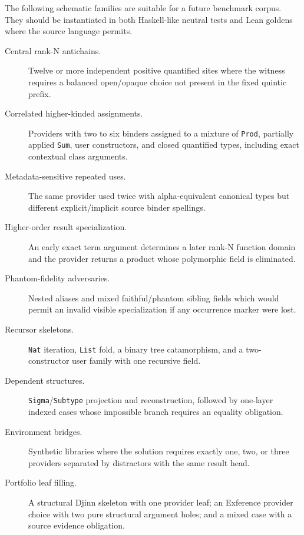 \documentclass[11pt]{article}
\newcommand{\code}[1]{\texttt{#1}}
\newcommand{\Djinn}{Djinn}
\newcommand{\Exference}{Exference}
\begin{document}
The following schematic families are suitable for a future benchmark corpus.
They should be instantiated in both Haskell-like neutral tests and Lean goldens
where the source language permits.

\begin{description}
  \item[Central rank-N antichains.]
    Twelve or more independent positive quantified sites where the witness
    requires a balanced open/opaque choice not present in the fixed quintic
    prefix.

  \item[Correlated higher-kinded assignments.]
    Providers with two to six binders assigned to a mixture of \code{Prod},
    partially applied \code{Sum}, user constructors, and closed quantified
    types, including exact contextual class arguments.

  \item[Metadata-sensitive repeated uses.]
    The same provider used twice with alpha-equivalent canonical types but
    different explicit/implicit source binder spellings.

  \item[Higher-order result specialization.]
    An early exact term argument determines a later rank-N function domain and
    the provider returns a product whose polymorphic field is eliminated.

  \item[Phantom-fidelity adversaries.]
    Nested aliases and mixed faithful/phantom sibling fields which would permit
    an invalid visible specialization if any occurrence marker were lost.

  \item[Recursor skeletons.]
    \code{Nat} iteration, \code{List} fold, a binary tree catamorphism, and a
    two-constructor user family with one recursive field.

  \item[Dependent structures.]
    \code{Sigma}/\code{Subtype} projection and reconstruction, followed by
    one-layer indexed cases whose impossible branch requires an equality
    obligation.

  \item[Environment bridges.]
    Synthetic libraries where the solution requires exactly one, two, or three
    providers separated by distractors with the same result head.

  \item[Portfolio leaf filling.]
    A structural \Djinn{} skeleton with one provider leaf; an \Exference{}
    provider choice with two pure structural argument holes; and a mixed case
    with a source evidence obligation.
\end{description}
\end{document}
